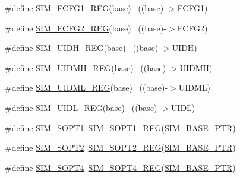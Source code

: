 \begin{DoxyCompactItemize}
\item 
\#define \hyperlink{group___s_i_m___register___accessor___macros_ga6cc80fd9f1edfd8f709d2c8fe3c97080}{S\+I\+M\+\_\+\+F\+C\+F\+G1\+\_\+\+R\+EG}(base)                                        ~((base)-\/$>$F\+C\+F\+G1)
\item 
\#define \hyperlink{group___s_i_m___register___accessor___macros_ga8e1caad19971280346dc9c767c8f4b6e}{S\+I\+M\+\_\+\+F\+C\+F\+G2\+\_\+\+R\+EG}(base)                                        ~((base)-\/$>$F\+C\+F\+G2)
\item 
\#define \hyperlink{group___s_i_m___register___accessor___macros_ga2c1fe45ab77b346f67b2f3bb2f59519a}{S\+I\+M\+\_\+\+U\+I\+D\+H\+\_\+\+R\+EG}(base)                                          ~((base)-\/$>$U\+I\+DH)
\item 
\#define \hyperlink{group___s_i_m___register___accessor___macros_gaffd69cc3f48c0e204d8c659424b4c51d}{S\+I\+M\+\_\+\+U\+I\+D\+M\+H\+\_\+\+R\+EG}(base)                                        ~((base)-\/$>$U\+I\+D\+MH)
\item 
\#define \hyperlink{group___s_i_m___register___accessor___macros_gaac80320f7e56ccd1cd6b54cfdc322430}{S\+I\+M\+\_\+\+U\+I\+D\+M\+L\+\_\+\+R\+EG}(base)                                        ~((base)-\/$>$U\+I\+D\+ML)
\item 
\#define \hyperlink{group___s_i_m___register___accessor___macros_ga50225b2615456e0a763efbe4ec59b077}{S\+I\+M\+\_\+\+U\+I\+D\+L\+\_\+\+R\+EG}(base)                                          ~((base)-\/$>$U\+I\+DL)
\item 
\#define \hyperlink{group___s_i_m___register___accessor___macros_ga2a1bceb27d0e81b2821f1f4f32a57c12}{S\+I\+M\+\_\+\+S\+O\+P\+T1}~\hyperlink{group___s_i_m___register___accessor___macros_ga4fb13e9e7e8bf019daf19284be9b0a73}{S\+I\+M\+\_\+\+S\+O\+P\+T1\+\_\+\+R\+EG}(\hyperlink{group___s_i_m___peripheral_ga719ec5df95fbb5732438f794f2cccf3c}{S\+I\+M\+\_\+\+B\+A\+S\+E\+\_\+\+P\+TR})
\item 
\#define \hyperlink{group___s_i_m___register___accessor___macros_ga487453818a3716783fc75d7bcb81de9f}{S\+I\+M\+\_\+\+S\+O\+P\+T2}~\hyperlink{group___s_i_m___register___accessor___macros_ga94d1a56cbf8d6fbebbd00363ce3cd130}{S\+I\+M\+\_\+\+S\+O\+P\+T2\+\_\+\+R\+EG}(\hyperlink{group___s_i_m___peripheral_ga719ec5df95fbb5732438f794f2cccf3c}{S\+I\+M\+\_\+\+B\+A\+S\+E\+\_\+\+P\+TR})
\item 
\#define \hyperlink{group___s_i_m___register___accessor___macros_ga22e96af138319442871c6c16b31c996f}{S\+I\+M\+\_\+\+S\+O\+P\+T4}~\hyperlink{group___s_i_m___register___accessor___macros_gae47c458103d1381ff7b7f25e45338a64}{S\+I\+M\+\_\+\+S\+O\+P\+T4\+\_\+\+R\+EG}(\hyperlink{group___s_i_m___peripheral_ga719ec5df95fbb5732438f794f2cccf3c}{S\+I\+M\+\_\+\+B\+A\+S\+E\+\_\+\+P\+TR})

\end{DoxyCompactItemize}
